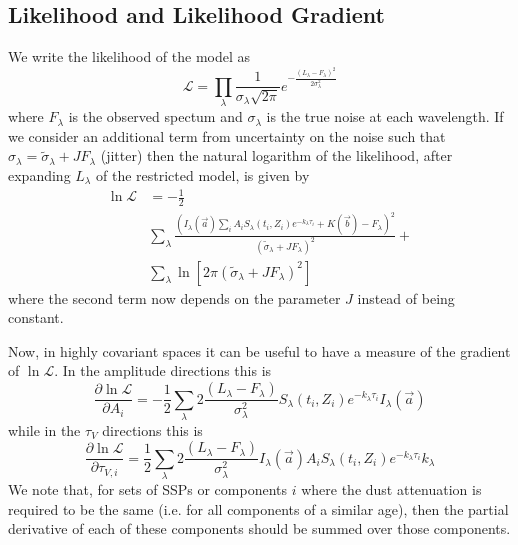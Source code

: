 \documentclass{emulateapj}
\begin{document}
\subsection{Likelihood and Likelihood Gradient}

We write the likelihood of the model as 
\begin{equation}
\mathcal{L} = \prod\limits_\lambda \frac{1}{\sigma_\lambda\sqrt{2\pi}} e^{-\frac{(L_\lambda - F_\lambda)^2}{2\sigma_\lambda^2}}
\end{equation}
where $F_\lambda$ is the observed spectum and $\sigma_\lambda $ is the true noise at each wavelength. If we consider an additional term from uncertainty on the noise such that $\sigma_\lambda = \tilde{\sigma}_\lambda + J F_\lambda$ (jitter) then the natural logarithm of the likelihood, after expanding $L_\lambda$ of the restricted model, is given by
\begin{equation}
\begin{split}
\ln \mathcal{L}  & = -\frac{1}{2} \\
& \sum\limits_\lambda \frac{ ( I_\lambda(\vec{a})\sum\limits_i A_i S_\lambda(t_i, Z_i) e^{-k_\lambda\tau_i} +K(\vec{b}) - F_\lambda)^2}{(\tilde{\sigma}_\lambda +J F_\lambda)^2}  + \\
& \sum\limits_\lambda\ln [2\pi(\tilde{\sigma}_\lambda +J F_\lambda)^2]
\end{split}
\end{equation}
where the second term now depends on the parameter $J$ instead of being constant.


Now, in highly covariant spaces it can be useful to have a measure of the gradient of $\ln\mathcal{L}$.  In the amplitude directions this is
\begin{equation}
\frac{\partial \ln\mathcal{L}}{\partial A_i} = -\frac{1}{2}\sum\limits_\lambda 2 \frac{(L_\lambda- F_\lambda)}{\sigma_\lambda^2} S_\lambda(t_i, Z_i) e^{-k_\lambda\tau_i} I_\lambda(\vec{a})
\end{equation}
while in the $\tau_{V}$ directions this is
\begin{equation}
\frac{\partial \ln\mathcal{L}}{\partial \tau_{V,i}} = \frac{1}{2}\sum\limits_\lambda 2 \frac{(L_\lambda- F_\lambda)}{\sigma_\lambda^2} I_\lambda(\vec{a}) A_i S_\lambda(t_i, Z_i) e^{-k_\lambda\tau_i} k_\lambda 
\end{equation}
We note that, for sets of SSPs or components $i$ where the dust attenuation is required to be the same (i.e. for all components of a similar age), then the partial derivative of each of these components should be summed over those components.
\end{document}
